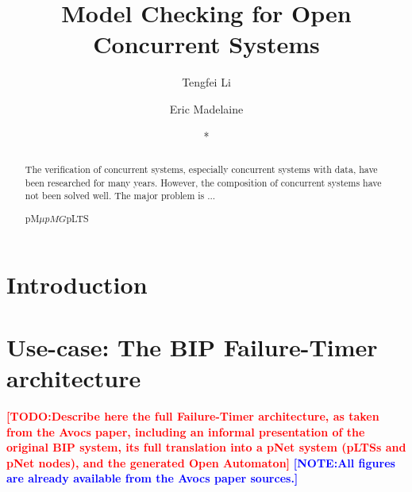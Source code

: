 \documentclass[runningheads,a4paper]{llncs}
\newcommand{\TODO}[1]{\textcolor{red}{\textbf{[TODO:#1]}}}
\newcommand{\NOTE}[1]{\textcolor{blue}{\textbf{[NOTE:#1]}}}
\newcommand{\keywords}[1]{\par\addvspace\baselineskip
\noindent\keywordname\enspace\ignorespaces#1}
\begin{document}
\mainmatter  %

\title{Model Checking for Open Concurrent Systems}


%
%
\author{Tengfei Li
\and Eric Madelaine \and *
}
%



\institute{
}

%
%

\maketitle


\begin{abstract}

The verification of concurrent systems, especially concurrent systems with data, have been researched for many years. However, the composition of concurrent systems have not been solved well. The major problem is ...

\keywords{ pM$\mu$\quad $pMG $\quad pLTS }
\end{abstract}


\section{Introduction}

\section{Use-case: The BIP Failure-Timer architecture}
\TODO{Describe here the full Failure-Timer architecture, as taken from the Avocs paper, including an informal presentation of the original BIP system, its full translation into a pNet system (pLTSs and pNet nodes), and the generated Open Automaton}
\NOTE{All figures are already available from the Avocs paper sources.}
\end{document}

